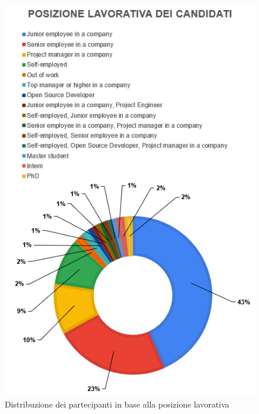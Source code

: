 \begin{figure}[h!]
    \centering
    \includegraphics[width=360pt]{figure/data-analysis/lavoro.png}
    \caption{Distribuzione dei partecipanti in base alla posizione lavorativa}
    \label{im-a-part-5}
\end{figure}

